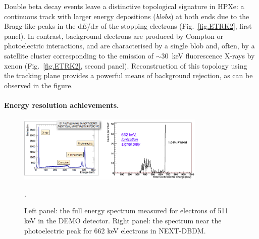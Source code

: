 Double beta decay events leave a distinctive topological signature in HPXe: a continuous track with larger energy depositions (\emph{blobs}) at both ends due to the Bragg-like peaks in the d$E$/d$x$ of the stopping electrons (Fig.~\ref{fig.ETRK2}, first panel). In contrast, background electrons are produced by Compton or photoelectric interactions, and are characterised by a single blob and, often, by a satellite cluster corresponding to the emission of $\sim30$~keV fluorescence X-rays by xenon (Fig.~\ref{fig.ETRK2}, second panel). Reconstruction of this topology using the tracking plane provides a powerful means of background rejection, as can be observed in the figure. 

%

\paragraph{Energy resolution achievements.}

\begin{figure}
\centering
\includegraphics[width=0.8\textwidth]{img/EResolution.png}
\caption{\small Left panel: the full energy spectrum measured for electrons of 511 keV in the DEMO detector. Right panel: the spectrum near the photoelectric peak for 662 keV electrons in NEXT-DBDM.}\label{fig.ERES}. 
\end{figure}

